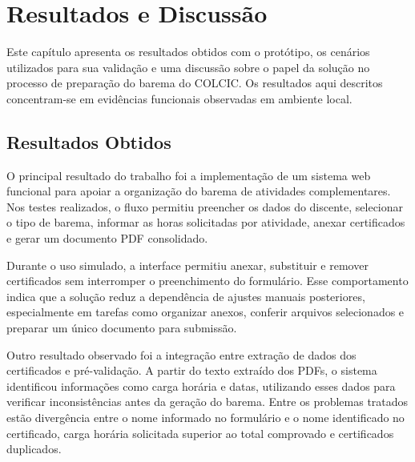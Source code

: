 \chapter{Resultados e Discussão}
\label{cap:resultados}

Este capítulo apresenta os resultados obtidos com o protótipo, os cenários utilizados para sua validação e uma discussão sobre o papel da solução no processo de preparação do barema do COLCIC. Os resultados aqui descritos concentram-se em evidências funcionais observadas em ambiente local.


\section{Resultados Obtidos}

O principal resultado do trabalho foi a implementação de um sistema web funcional para apoiar a organização do barema de atividades complementares. Nos testes realizados, o fluxo permitiu preencher os dados do discente, selecionar o tipo de barema, informar as horas solicitadas por atividade, anexar certificados e gerar um documento PDF consolidado.


Durante o uso simulado, a interface permitiu anexar, substituir e remover certificados sem interromper o preenchimento do formulário. Esse comportamento indica que a solução reduz a dependência de ajustes manuais posteriores, especialmente em tarefas como organizar anexos, conferir arquivos selecionados e preparar um único documento para submissão.


Outro resultado observado foi a integração entre extração de dados dos certificados e pré-validação. A partir do texto extraído dos PDFs, o sistema identificou informações como carga horária e datas, utilizando esses dados para verificar inconsistências antes da geração do barema. Entre os problemas tratados estão divergência entre o nome informado no formulário e o nome identificado no certificado, carga horária solicitada superior ao total comprovado e certificados duplicados.

